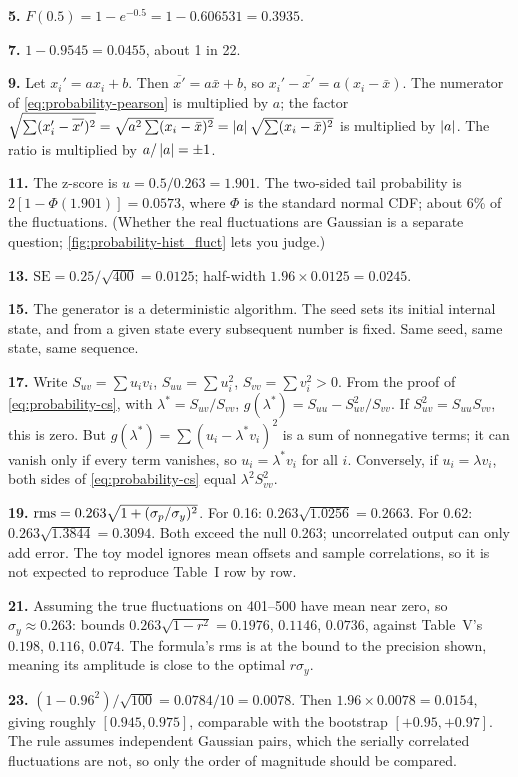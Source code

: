 \textbf{5.} $F(0.5)=1-e^{-0.5}=1-0.606531=0.3935$.

\textbf{7.} $1-0.9545=0.0455$, about 1 in 22.

\textbf{9.} Let $x_i'=ax_i+b$. Then $\overline{x'}=a\bar x+b$, so $x_i'-\overline{x'}=a(x_i-\bar x)$. The numerator of \cref{eq:probability-pearson} is multiplied by $a$; the factor $\sqrt{\sum(x_i'-\overline{x'})^2}=\sqrt{a^2\sum(x_i-\bar x)^2}=\left\lvert a\right\rvert\sqrt{\sum(x_i-\bar x)^2}$ is multiplied by $\left\lvert a\right\rvert$. The ratio is multiplied by $a/\left\lvert a\right\rvert=\pm1$.

\textbf{11.} The z-score is $u=0.5/0.263=1.901$. The two-sided tail probability is $2[1-\Phi(1.901)]=0.0573$, where $\Phi$ is the standard normal CDF; about 6\% of the fluctuations. (Whether the real fluctuations are Gaussian is a separate question; \cref{fig:probability-hist_fluct} lets you judge.)

\textbf{13.} $\mathrm{SE}=0.25/\sqrt{400}=0.0125$; half-width $1.96\times0.0125=0.0245$.

\textbf{15.} The generator is a deterministic algorithm. The seed sets its initial internal state, and from a given state every subsequent number is fixed. Same seed, same state, same sequence.

\textbf{17.} Write $S_{uv}=\sum u_iv_i$, $S_{uu}=\sum u_i^2$, $S_{vv}=\sum v_i^2>0$. From the proof of \cref{eq:probability-cs}, with $\lambda^*=S_{uv}/S_{vv}$, $g(\lambda^*)=S_{uu}-S_{uv}^2/S_{vv}$. If $S_{uv}^2=S_{uu}S_{vv}$, this is zero. But $g(\lambda^*)=\sum(u_i-\lambda^*v_i)^2$ is a sum of nonnegative terms; it can vanish only if every term vanishes, so $u_i=\lambda^*v_i$ for all $i$. Conversely, if $u_i=\lambda v_i$, both sides of \cref{eq:probability-cs} equal $\lambda^2S_{vv}^2$.

\textbf{19.} $\mathrm{rms}=0.263\sqrt{1+(\sigma_p/\sigma_y)^2}$. For 0.16: $0.263\sqrt{1.0256}=0.2663$. For 0.62: $0.263\sqrt{1.3844}=0.3094$. Both exceed the null 0.263; uncorrelated output can only add error. The toy model ignores mean offsets and sample correlations, so it is not expected to reproduce Table~I row by row.

\textbf{21.} Assuming the true fluctuations on 401--500 have mean near zero, so $\sigma_y\approx0.263$: bounds $0.263\sqrt{1-r^2}=0.1976$, $0.1146$, $0.0736$, against Table~V's $0.198$, $0.116$, $0.074$. The formula's rms is at the bound to the precision shown, meaning its amplitude is close to the optimal $r\sigma_y$.

\textbf{23.} $(1-0.96^2)/\sqrt{100}=0.0784/10=0.0078$. Then $1.96\times0.0078=0.0154$, giving roughly $[0.945,0.975]$, comparable with the bootstrap $[+0.95,+0.97]$. The rule assumes independent Gaussian pairs, which the serially correlated fluctuations are not, so only the order of magnitude should be compared.

